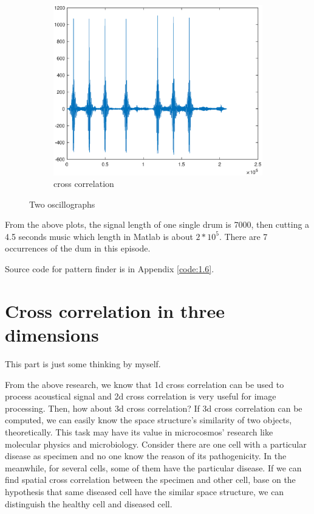\begin{figure}[h!]
\begin{subfigure}[t]{0.32\linewidth}
		\centering
		\includegraphics[width=1\linewidth]{figures/part1/crr_vis3.eps}
		\caption{cross correlation}
		\label{fig:crr_vis3}
	\end{subfigure}
	\caption{Two oscillographs}
	\label{fig:wave}
\end{figure} 

From the above plots, the signal length of one single drum is 7000, then cutting a 4.5 seconds music which length in Matlab is about $2*10^5$. There are 7 occurrences of the dum in this episode.

Source code for pattern finder is in Appendix \ref{code:1.6}.

\section{Cross correlation in three dimensions}

This part is just some thinking by myself. 

From the above research, we know that 1d cross correlation can be used to process acoustical signal and 2d cross correlation is very useful for image processing. Then, how about 3d cross correlation? If 3d cross correlation can be computed, we can easily know the space structure's similarity of two objects, theoretically. This task may have its value in microcosmos' research like molecular physics and microbiology. Consider there are one cell with a particular disease as specimen and no one know the reason of its pathogenicity. In the meanwhile, for several cells, some of them have the particular disease. If we can find spatial cross correlation between the specimen and other cell, base on the hypothesis that same diseased cell have the similar space structure, we can distinguish the healthy cell and diseased cell. 

